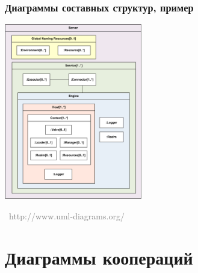 \documentclass[xetex,mathserif,serif]{beamer}
\newcommand{\attribution}[1] {
	\vspace{-5mm}\begin{flushright}\begin{scriptsize}\textcolor{gray}{\textcopyright\, #1}\end{scriptsize}\end{flushright}
}
\begin{document}
	\begin{frame}
		\frametitle{Диаграммы составных структур, пример}
		\begin{center}
			\includegraphics[width=0.45\textwidth]{compositeStructureExample.png}
			\attribution{http://www.uml-diagrams.org/}
		\end{center}
	\end{frame}

	\section{Диаграммы коопераций}
\end{document}
